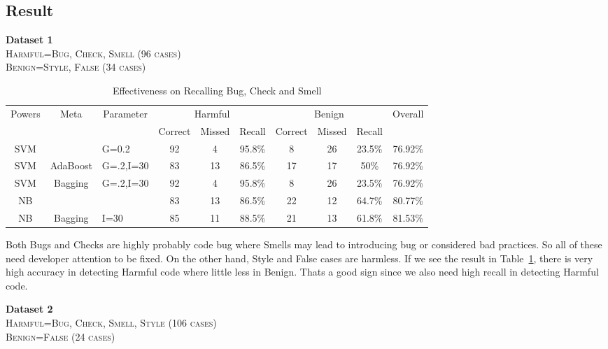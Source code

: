 \documentclass[11pt]{article}
\begin{document}
\subsection{Result}
\textbf{Dataset 1}\\
\textsc{Harmful=Bug, Check, Smell (96 cases)}\\
\textsc{Benign=Style, False (34 cases)}\\

\begin{table}[h!]
\centering
\begin{tabular*}{1\textwidth}{|c|c| p{.1in} |c|c|c|c|c|c|c|}
\hline
\multicolumn{1}{|c|}{\multirow{2}{*}{Powers}} & 
\multicolumn{1}{|c|}{\multirow{2}{*}{Meta}} & 
\multicolumn{1}{|c|}{\multirow{2}{*}{Parameter}} & 
\multicolumn{3}{|c|}{Harmful} & 
\multicolumn{3}{|c|}{Benign} & 
\multicolumn{1}{|c|}{\multirow{2}{*}{Overall}} \\
\cline{4-9}

& & & Correct & Missed & Recall & Correct & Missed & Recall & \\
\hline

SVM & & G=0.2 & 92 & 4 & 95.8\% & 8 & 26 & 23.5\% & 76.92\% \\
\hline
SVM & AdaBoost & G=.2,I=30 & 83 & 13 & 86.5\% & 17 & 17 & 50\% & 76.92\% \\
\hline
SVM	& Bagging& G=.2,I=30  & 92 & 4 & 95.8\% & 8 & 26 & 23.5\% & 76.92\% \\
\hline
NB & & & 83 & 13 & 86.5\% & 22 & 12 & 64.7\% & 80.77\% \\
\hline
NB & Bagging & I=30 & 85 & 11 & 88.5\% & 21 & 13 & 61.8\% & 81.53\% \\
\hline
\end{tabular*}
\caption{Effectiveness on Recalling Bug, Check and Smell}
\label{tab:dataset1}
\end{table}


\noindent
Both Bugs and Checks are highly probably code bug where Smells may lead to introducing bug or considered bad practices. So all of these need developer attention to be fixed. On the other hand, Style and False cases are harmless. If we see the result in Table~\ref{tab:dataset1}, there is very high accuracy in detecting Harmful code where little less in Benign. Thats a good sign since we also need high recall in detecting Harmful code.

\vspace{10 pt}
\noindent
\textbf{Dataset 2}\\
\textsc{Harmful=Bug, Check, Smell, Style (106 cases)}\\
\textsc{Benign=False (24 cases)}\\
\end{document}
